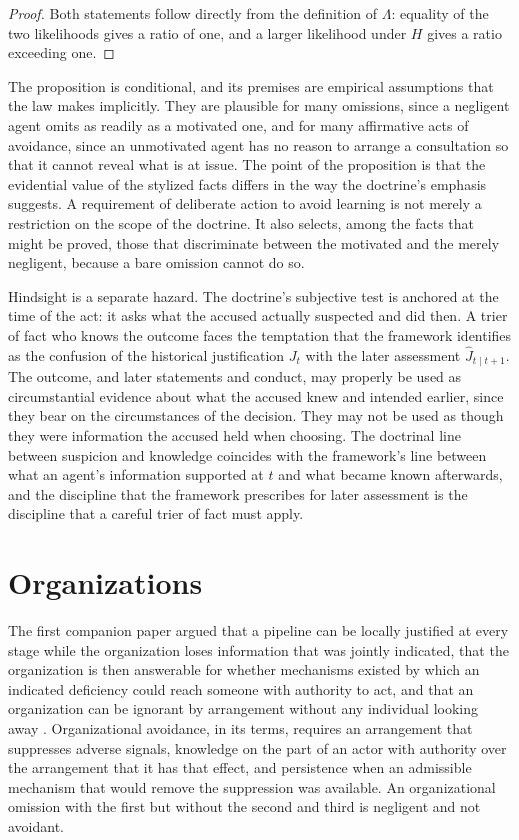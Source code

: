 \documentclass[11pt]{article}
\theoremstyle{plain}
\theoremstyle{definition}
\begin{document}
\begin{proof}
Both statements follow directly from the definition of $\Lambda$: equality of the two likelihoods gives a ratio of one, and a larger likelihood under $H$ gives a ratio exceeding one.
\end{proof}

The proposition is conditional, and its premises are empirical assumptions that the law makes implicitly. They are plausible for many omissions, since a negligent agent omits as readily as a motivated one, and for many affirmative acts of avoidance, since an unmotivated agent has no reason to arrange a consultation so that it cannot reveal what is at issue. The point of the proposition is that the evidential value of the stylized facts differs in the way the doctrine's emphasis suggests. A requirement of deliberate action to avoid learning is not merely a restriction on the scope of the doctrine. It also selects, among the facts that might be proved, those that discriminate between the motivated and the merely negligent, because a bare omission cannot do so.

Hindsight is a separate hazard. The doctrine's subjective test is anchored at the time of the act: it asks what the accused actually suspected and did then. A trier of fact who knows the outcome faces the temptation that the framework identifies as the confusion of the historical justification $J_t$ with the later assessment $\widehat J_{t\mid t+1}$. The outcome, and later statements and conduct, may properly be used as circumstantial evidence about what the accused knew and intended earlier, since they bear on the circumstances of the decision. They may not be used as though they were information the accused held when choosing. The doctrinal line between suspicion and knowledge coincides with the framework's line between what an agent's information supported at $t$ and what became known afterwards, and the discipline that the framework prescribes for later assessment is the discipline that a careful trier of fact must apply.

\section{Organizations}

The first companion paper argued that a pipeline can be locally justified at every stage while the organization loses information that was jointly indicated, that the organization is then answerable for whether mechanisms existed by which an indicated deficiency could reach someone with authority to act, and that an organization can be ignorant by arrangement without any individual looking away \cite{flyxion2026inputs}. Organizational avoidance, in its terms, requires an arrangement that suppresses adverse signals, knowledge on the part of an actor with authority over the arrangement that it has that effect, and persistence when an admissible mechanism that would remove the suppression was available. An organizational omission with the first but without the second and third is negligent and not avoidant.
\end{document}
